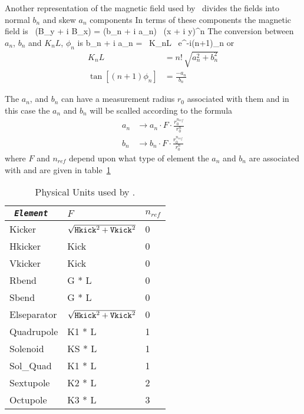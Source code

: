Another representation of the magnetic field used by \bmad\ divides
the fields into normal $b_n$ and skew $a_n$ components In terms of
these components the magnetic field is
\Begineq
   \, (B_y + i B_x) = (b_n + i a_n) \, (x + i y)^n
\Endeq
The conversion between $a_n$, $b_n$ and $K_nL$, $\phi_n$ is
\Begineq
  b_n + i a_n =  \, K_nL \, e^{-i(n+1)\phi_n}
\Endeq
or
\begin{align}
  K_n L &= n! \, \sqrt{a_n^2 + b_n^2} \\
  \tan[(n+1) \phi_n] &= \frac{-a_n}{b_n}
\end{align}

The $a_n$, and $b_n$ can have a measurement radius $r_0$ associated
with them and in this case the $a_n$ and $b_n$ will be scalled
according to the formula
\begin{align}
  a_n &\rightarrow a_n \cdot F \cdot \frac{r_0^{n_{ref}}}{r_0^n} \nonumber \\
  b_n &\rightarrow b_n \cdot F \cdot \frac{r_0^{n_{ref}}}{r_0^n}
\end{align}
where $F$ and $n_{ref}$ depend upon what type of element the $a_n$ and
$b_n$ are associated with and are given in table~\ref{t:ab}

\begin{table}[h]
\centering
\begin{tabular}{|l|l|l|} \hline
\tt
  {\em Element} & $F$                                    & $n_{ref}$ \\ \hline
  Kicker        & $\sqrt{{\tt Hkick}^2 + {\tt Vkick}^2}$ & 0 \\
  Hkicker       & Kick                                   & 0 \\
  Vkicker       & Kick                                   & 0 \\
  Rbend         & G * L                                  & 0 \\
  Sbend         & G * L                                  & 0 \\
  Elseparator   & $\sqrt{{\tt Hkick}^2 + {\tt Vkick}^2}$ & 0 \\
  Quadrupole    & K1 * L                                 & 1 \\
  Solenoid      & KS * L                                 & 1 \\
  Sol\_Quad     & K1 * L                                 & 1 \\
  Sextupole     & K2 * L                                 & 2 \\
  Octupole      & K3 * L                                 & 3 \\ \hline
\end{tabular}
\caption{Physical Units used by \bmad.}
\label{t:ab}
\end{table}

